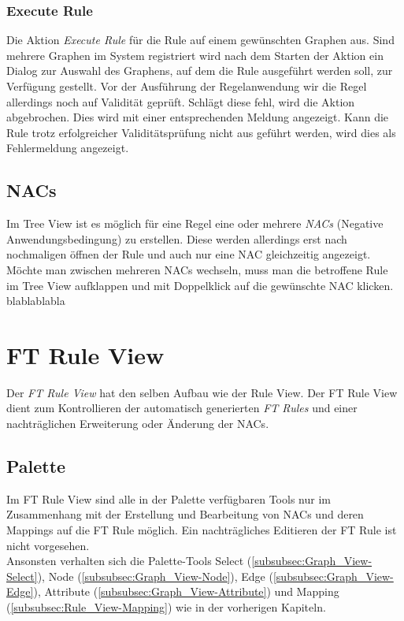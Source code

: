 \subsubsection{Execute Rule}
Die Aktion \emph{Execute Rule} für die Rule auf einem gewünschten Graphen aus. Sind mehrere Graphen im System registriert wird nach dem Starten der Aktion ein Dialog zur Auswahl des Graphens, auf dem die Rule ausgeführt werden soll, zur Verfügung gestellt. Vor der Ausführung der Regelanwendung wir die Regel allerdings noch auf Validität geprüft. Schlägt diese fehl, wird die Aktion abgebrochen. Dies wird mit einer entsprechenden Meldung angezeigt. Kann die Rule trotz erfolgreicher Validitätsprüfung nicht aus geführt werden, wird dies als Fehlermeldung angezeigt.

\subsection{NACs}
Im Tree View ist es möglich für eine Regel eine oder mehrere \emph{NACs} (Negative Anwendungsbedingung) zu erstellen. Diese werden allerdings erst nach nochmaligen öffnen der Rule und auch nur eine NAC gleichzeitig angezeigt. Möchte man zwischen mehreren NACs wechseln, muss man die betroffene Rule im Tree View aufklappen und mit Doppelklick auf die gewünschte NAC klicken.\\
blablablabla

\section{FT Rule View}
Der \emph{FT Rule View} hat den selben Aufbau wie der Rule View. Der FT Rule View dient zum Kontrollieren der automatisch generierten \emph{FT Rules} und einer nachträglichen Erweiterung oder Änderung der NACs. 

\subsection{Palette}
Im FT Rule View sind alle in der Palette verfügbaren Tools nur im Zusammenhang mit der Erstellung und Bearbeitung von NACs und deren Mappings auf die FT Rule möglich. Ein nachträgliches Editieren der FT Rule ist nicht vorgesehen. \\
Ansonsten verhalten sich die Palette-Tools Select (\ref{subsubsec:Graph_View-Select}), Node (\ref{subsubsec:Graph_View-Node}), Edge (\ref{subsubsec:Graph_View-Edge}), Attribute (\ref{subsubsec:Graph_View-Attribute}) und Mapping (\ref{subsubsec:Rule_View-Mapping}) wie in der vorherigen Kapiteln.

